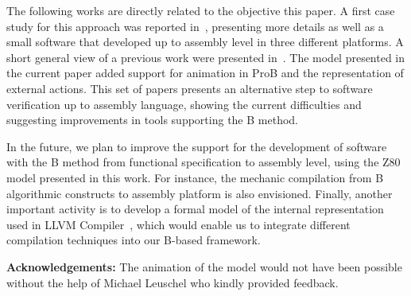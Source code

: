 \documentclass[a4paper]{llncs}
\begin{document}

The following works are directly related to the objective this paper.
A first case study for this approach was reported in~\cite{Dantas_SBMF08}, presenting
more details as well as a small software that developed up to assembly
level in three different platforms. A short general view of a previous work
were presented in~\cite{Valerio_SBMF09}. The model presented in the 
current paper added support for animation in ProB and the representation
of external actions.
This set of papers presents an alternative step to software verification
up to assembly language, showing the current difficulties and
suggesting improvements in tools supporting the B method.

In the future, we plan to improve the support for the development of
software with the B method from functional specification to assembly
level, using the Z80 model presented in this work. For instance, the
mechanic compilation from B algorithmic constructs to assembly
platform is also envisioned. Finally, another important activity is to
develop a formal model of the internal representation used in LLVM
Compiler~\cite{DBLP:conf/cgo/LattnerA04}, which would enable us to
integrate different compilation techniques into our B-based framework.


\textbf{Acknowledgements:} The animation of the model would not
have been possible without the help of Michael Leuschel who kindly
provided feedback.%



\end{document}
